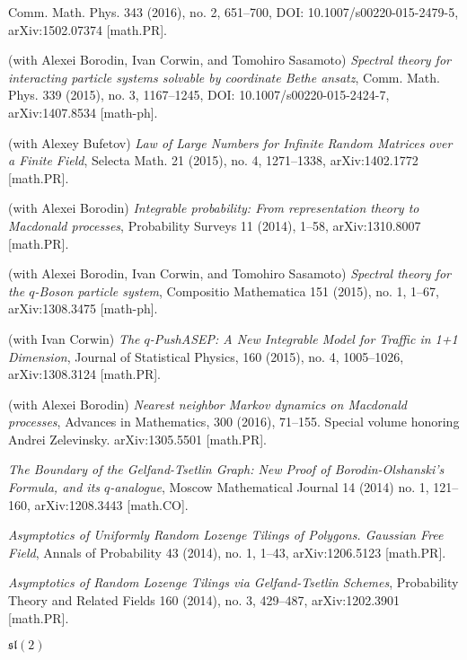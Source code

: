 \documentclass[letterpaper,11pt]{article}
\begin{document}
\begin{etaremune}
	      Comm. Math. Phys. 343 (2016), no. 2, 651--700, DOI:
	      10.1007/s00220-015-2479-5, arXiv:1502.07374 [math.PR].
	\item
	      (with Alexei Borodin, Ivan Corwin, and Tomohiro Sasamoto)
	      \emph{Spectral theory for interacting particle systems solvable
		      by coordinate Bethe ansatz},
	      Comm. Math. Phys. 339 (2015), no. 3, 1167--1245, DOI:
	      10.1007/s00220-015-2424-7, arXiv:1407.8534 [math-ph].
	\item
	      (with Alexey Bufetov)
	      \emph{Law of Large Numbers for Infinite Random Matrices over a
		      Finite Field},
	      Selecta Math. 21 (2015), no. 4, 1271--1338, arXiv:1402.1772
	      [math.PR].
	\item
	      (with Alexei Borodin)
	      \emph{Integrable probability: From representation theory to
		      Macdonald processes},
	      Probability Surveys 11 (2014), 1--58, arXiv:1310.8007 [math.PR].
	\item
	      (with Alexei Borodin, Ivan Corwin, and Tomohiro Sasamoto)
	      \emph{Spectral theory for the $q$-Boson particle system},
	      Compositio Mathematica 151 (2015), no. 1, 1--67, arXiv:1308.3475
	      [math-ph].
	\item
	      (with Ivan Corwin)
	      \emph{The $q$-PushASEP: A New Integrable Model for Traffic in
		      1+1 Dimension},
	      Journal of Statistical Physics, 160 (2015), no. 4, 1005--1026,
	      arXiv:1308.3124 [math.PR].
	\item
	      (with Alexei Borodin)
	      \emph{Nearest neighbor Markov dynamics on Macdonald processes},
	      Advances in Mathematics, 300 (2016), 71--155. Special volume
	      honoring Andrei Zelevinsky. arXiv:1305.5501 [math.PR].
	\item
	      \emph{The Boundary of the Gelfand-Tsetlin Graph: New Proof of
		      Borodin-Olshanski's Formula, and its $q$-analogue},
	      Moscow Mathematical Journal 14 (2014) no. 1, 121--160,
	      arXiv:1208.3443 [math.CO].
	\item
	      \emph{Asymptotics of Uniformly Random Lozenge Tilings of
		      Polygons. Gaussian Free Field},
	      Annals of Probability 43 (2014), no. 1, 1--43, arXiv:1206.5123
	      [math.PR].
	\item
	      \emph{Asymptotics of Random Lozenge Tilings via Gelfand-Tsetlin
		      Schemes},
	      Probability Theory and Related Fields 160 (2014), no. 3,
	      429--487, arXiv:1202.3901 [math.PR].
	\item
	      \emph{$\mathfrak{sl}(2)$
}
\end{etaremune}
\end{document}
